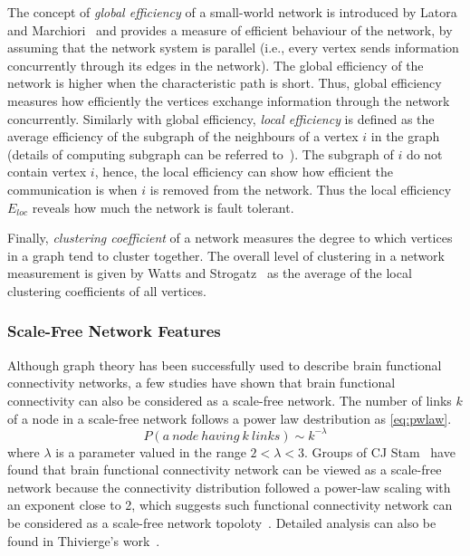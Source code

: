The concept of \emph{global efficiency} of a small-world network is introduced by Latora and Marchiori~\cite{latora2001efficient} and provides a measure of efficient behaviour of the network, by assuming that the network system is parallel (i.e., every vertex sends information concurrently through its edges in the network). The global efficiency of the network is higher when the characteristic path is short. Thus, global efficiency measures how efficiently the vertices exchange information through the network concurrently. Similarly with global efficiency, \emph{local efficiency} is defined as the average efficiency of the subgraph of the neighbours of a vertex $i$ in the graph (details of computing subgraph can be referred to~\cite{ullmann1976algorithm}). The subgraph of $i$ do not contain vertex $i$, hence, the local efficiency can show how efficient the communication is when $i$ is removed from the network. Thus the local efficiency $E_{loc}$ reveals how much the network is fault tolerant. 

Finally, \emph{clustering coefficient} of a network measures the degree to which vertices in a graph tend to cluster together. The overall level of clustering in a network measurement is given by Watts and Strogatz~\cite{watts1998collective} as the average of the local clustering coefficients of all vertices. 

\subsubsection{Scale-Free Network Features}
Although graph theory has been successfully used to describe brain functional connectivity networks, a few studies have shown that brain functional connectivity can also be considered as a scale-free network. The number of links $k$ of a node in a scale-free network follows a power law destribution as \eqref{eq:pwlaw}.
\begin{equation} \label{eq:pwlaw}
P(a \ node \ having \ k \ links ) \sim k^{-\lambda}
\end{equation}
where $\lambda$ is a parameter valued in the range $2<\lambda<3$.
Groups of CJ Stam~\cite{stam2004functional} have found that brain functional connectivity network can be viewed as a scale-free network because the connectivity distribution followed a power-law scaling with an exponent close to 2, which suggests such functional connectivity network can be considered as a scale-free network topoloty~\cite{van2008small}. Detailed analysis can also be found in Thivierge's work~\cite{thivierge2014scale}.

